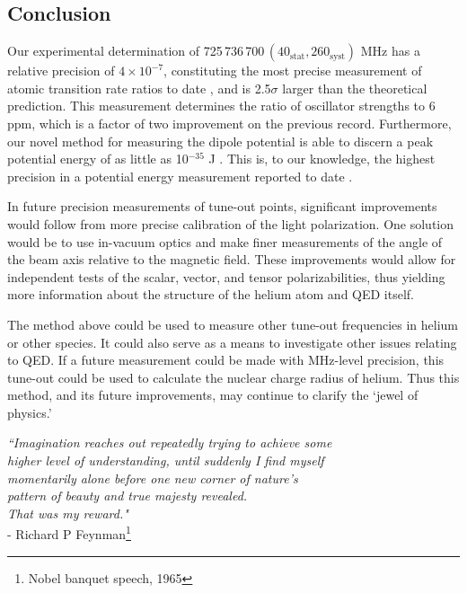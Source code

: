 \subsection{Conclusion}
	\label{sec:TO_conc}
	Our experimental determination of 725\,736\,700\,$(40_{\mathrm{stat}},260_{\mathrm{syst}})$ MHz has a relative precision of $4\times 10^{-7}$, constituting the most precise measurement of atomic transition rate ratios to date \cite{Mitroy13}, and is 2.5$\sigma$ larger than the theoretical prediction. 
	This measurement determines the ratio of oscillator strengths to 6 ppm, which is a factor of two improvement on the previous record. 
	Furthermore, our novel method for measuring the dipole potential is able to discern a peak potential energy of as little as 10$^{-35}$ J . This is, to our knowledge, the highest precision in a potential energy measurement reported to date \cite{Henson22}.
	 
	In future precision measurements of tune-out points, significant improvements would follow from more precise calibration of the light polarization.
	One solution would be to use in-vacuum optics and make finer measurements of the angle of the beam axis relative to the magnetic field.
	These improvements would allow for independent tests of the scalar, vector, and tensor polarizabilities, thus yielding more information about the structure of the helium atom and QED itself.

	The method above could be used to measure other tune-out frequencies in helium or other species.
	It could also serve as a means to investigate other issues relating to QED. 
	If a future measurement could be made with MHz-level precision,  this tune-out could be used to calculate the nuclear charge radius of helium. 
	Thus this method, and its future improvements, may continue to  clarify the `jewel of physics.'

\vfill


\begin{flushright}
\singlespacing
{\emph{
``Imagination reaches out repeatedly trying to achieve some \\
higher level of understanding, until suddenly I find myself \\
momentarily alone before one new corner of nature’s \\
pattern of beauty and true majesty revealed. \\
That was my reward."}\\ 
- Richard P Feynman\footnote{Nobel banquet speech, 1965}}
\end{flushright}
\onehalfspacing




